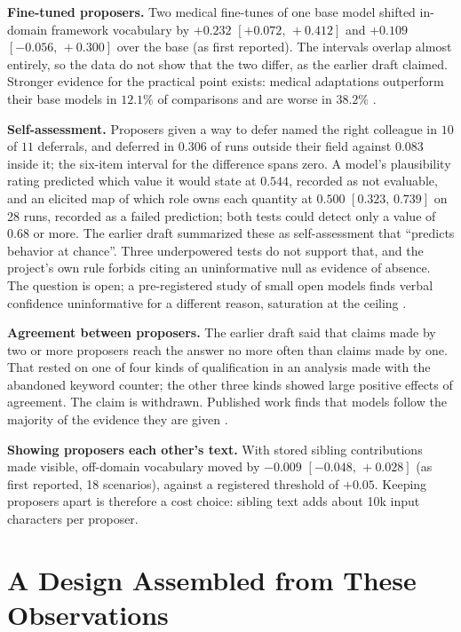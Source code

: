 \documentclass[10pt,twocolumn]{article}
\newcommand{\ci}[2]{\ensuremath{[#1,\,#2]}}
\begin{document}
\textbf{Fine-tuned proposers.} Two medical fine-tunes of one base model
shifted in-domain framework vocabulary by $+0.232$
\ci{+0.072}{+0.412} and $+0.109$ \ci{-0.056}{+0.300} over the base (as
first reported). The intervals overlap almost entirely, so the data do
not show that the two differ, as the earlier draft claimed. Stronger
evidence for the practical point exists: medical adaptations outperform
their base models in $12.1\%$ of comparisons and are worse in $38.2\%$
\cite{jeong2024medical}.

\textbf{Self-assessment.} Proposers given a way to defer named the
right colleague in $10$ of $11$ deferrals, and deferred in $0.306$ of
runs outside their field against $0.083$ inside it; the six-item
interval for the difference spans zero. A model's plausibility rating
predicted which value it would state at $0.544$, recorded as not
evaluable, and an elicited map of which role owns each quantity at
$0.500$ \ci{0.323}{0.739} on 28 runs, recorded as a failed prediction;
both tests could detect only a value of $0.68$ or more. The earlier
draft summarized these as self-assessment that ``predicts behavior at
chance''. Three underpowered tests do not support that, and the
project's own rule forbids citing an uninformative null as evidence of
absence. The question is open; a pre-registered study of small open
models finds verbal confidence uninformative for a different reason,
saturation at the ceiling \cite{cacioli2026verbal}.

\textbf{Agreement between proposers.} The earlier draft said that
claims made by two or more proposers reach the answer no more often
than claims made by one. That rested on one of four kinds of
qualification in an analysis made with the abandoned keyword counter;
the other three kinds showed large positive effects of agreement. The
claim is withdrawn. Published work finds that models follow the
majority of the evidence they are given \cite{xie2024chameleon}.

\textbf{Showing proposers each other's text.} With stored sibling
contributions made visible, off-domain vocabulary moved by $-0.009$
\ci{-0.048}{+0.028} (as first reported, 18 scenarios), against a
registered threshold of $+0.05$. Keeping proposers apart is therefore a
cost choice: sibling text adds about 10k input characters per proposer.

\section{A Design Assembled from These Observations}
\label{sec:harness}
\end{document}
